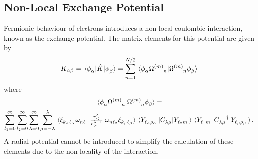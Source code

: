 \documentclass[draft]{article}
\begin{document}
\subsection{Non-Local Exchange Potential}
\label{sec:exchange}

Fermionic behaviour of electrons introduces a non-local coulombic interaction,
known as the exchange potential.
The matrix elements for this potential are given by
\begin{equation*}
  K_{\alpha \beta}
  =
  \mel*{
    \sturmian[_{\alpha}]
  }{
    \hat{K}
  }{
    \sturmian[_{\beta}]
  }
  =
  \sum_{n = 1}^{N/2}
  \braket*{
    \sturmian[_{\alpha}]
    \orbital[^{\lr{\proj}}_n]
  }{
    \orbital[^{\lr{\proj}}_n]
    \sturmian[_{\beta}]
  }
\end{equation*}
where
\begin{multline*}
  \braket*{
    \sturmian[_{\alpha}]
    \orbital[^{\lr{\proj}}_n]
  }{
    \orbital[^{\lr{\proj}}_n]
    \sturmian[_{\beta}]
  }
  =
  \\
  \sum_{l_{1} = 0}^{\infty}
  \sum_{l_{2} = 0}^{\infty}
  \sum_{\lambda = 0}^{\infty}
  \sum_{\mu = -\lambda}^{\lambda}
  \mel*{
    \laguerre[_{k_{\alpha} \ang_{\alpha}}]
    \orbitalpw[_{n \ang_{1}}]
  }{
    \tfrac
    {
      r_{<}^{\lambda}
    }
    {
      r_{>}^{\lambda + 1}
    }
  }{
    \orbitalpw[_{n \ang_{2}}]
    \laguerre[_{k_{\beta} \ang_{\beta}}]
  }
  \mel*{
    \harmonic[_{\ang_{\alpha} \rho_{\alpha}}]
  }{
    \irrep[_{\lambda \mu}]
  }{
    \harmonic[_{\ang_{2} \proj}]
  }
  \mel*{
    \harmonic[_{\ang_{1} \proj}]
  }{
    {\irrep[_{\lambda \mu}]}^{\dagger}
  }{
    \harmonic[_{\ang_{\beta} \rho_{\beta}}]
  }.
\end{multline*}
A radial potential cannot be introduced to simplify the calculation of these
elements due to the non-locality of the interaction.
\end{document}
